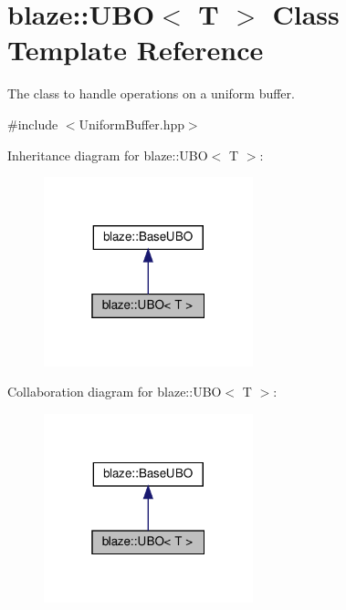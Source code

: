 \hypertarget{classblaze_1_1UBO}{}\section{blaze\+:\+:U\+BO$<$ T $>$ Class Template Reference}
\label{classblaze_1_1UBO}


The class to handle operations on a uniform buffer.  




{\ttfamily \#include $<$Uniform\+Buffer.\+hpp$>$}



Inheritance diagram for blaze\+:\+:U\+BO$<$ T $>$\+:\nopagebreak
\begin{figure}[H]
\begin{center}
\leavevmode
\includegraphics[width=172pt]{classblaze_1_1UBO__inherit__graph}
\end{center}
\end{figure}


Collaboration diagram for blaze\+:\+:U\+BO$<$ T $>$\+:\nopagebreak
\begin{figure}[H]
\begin{center}
\leavevmode
\includegraphics[width=172pt]{classblaze_1_1UBO__coll__graph}
\end{center}
\end{figure}

